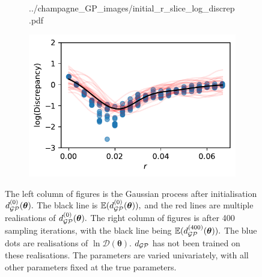 \begin{figure}[htbp]
\begin{subfigure}[b]{0.5\textwidth}
{            ../champagne_GP_images/initial_r_slice_log_discrep.pdf
        }
    \end{subfigure}%
    \hfill%
    \begin{subfigure}[b]{0.5\textwidth}
        \centering
        \includegraphics[width=\textwidth]{
            ../champagne_GP_images/r_slice_400_bolfi_updates_log_discrep.pdf
        }
    \end{subfigure}
    \caption{
        The left column of figures is the Gaussian process after initialisation
        $d_{\mathcal{GP}}^{(0)}(\bm{\theta}).$ The black line is $\operatorname{\mathbb{E}}(d_{\mathcal{GP}}^{(0)}(\bm{\theta})),$
        and the red lines are multiple realisations of
        $d_{\mathcal{GP}}^{(0)}(\bm{\theta}).$ The right column of figures is after 400
        sampling iterations, with the black line being
        $\operatorname{\mathbb{E}}(d_{\mathcal{GP}}^{(400)}(\bm{\theta})).$
        The blue dots are realisations of $\ln\mathcal{D}(\bm{\theta}).$
        $d_{\mathcal{GP}}$ has not been trained on these realisations.
        The parameters are varied
        univariately, with all other parameters fixed at the true parameters.
    }
    \label{fig:improving_GP}
\end{figure}

